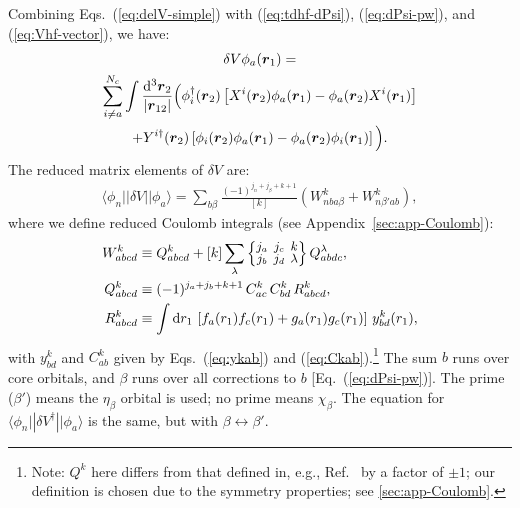 \documentclass[10pt,twocolumn,a4paper]{article}%
\newcommand{\bra}[1]{\ensuremath{\langle #1|}}	%
\newcommand{\ket}[1]{\ensuremath{|#1\rangle}}	%
\newcommand{\sixj}[6]{\renewcommand\arraystretch{0.75}\setlength\arraycolsep{2pt}\small\ensuremath{\begin{Bmatrix}#1&#2&#3\\#4&#5&#6\end{Bmatrix}}}	%
\renewcommand{\v}[1]{\ensuremath{\boldsymbol{#1}}}		%
\newcommand{\be}{\begin{equation}}
\newcommand{\ee}{\end{equation}}
\def\d{\ensuremath{{\rm d}}}
\renewcommand{\b}{\ensuremath{\beta}}
\begin{document}
Combining Eqs.~(\ref{eq:delV-simple}) with (\ref{eq:tdhf-dPsi}), (\ref{eq:dPsi-pw}), and (\ref{eq:Vhf-vector}), we have:
\begin{multline}\label{eq:del-Vhf-vector}
\delta V\phi_a(\v{r}_1) = \\
\sum_{i\neq a}^{N_c}\int \frac{\d^3\v{r}_2}{|\v{r}_{12}|}
\Big(
\phi_i^\dag(\v{r}_2)\left[
X^i(\v{r}_2)\phi_a(\v{r}_1)
-\phi_a(\v{r}_2)  X^i(\v{r}_1)\right]\\
%
+Y^{i\dag}(\v{r}_2)\left[
\phi_i(\v{r}_2)  \phi_a(\v{r}_1)
-\phi_a(\v{r}_2) \phi_i(\v{r}_1)\right]
\Big).
\end{multline}
%
The reduced matrix elements of $\delta V$ are:
\begin{multline}\label{eq:dV-rme}
\bra{\phi_n}|\delta V|\ket{\phi_a}
 =
 \sum_{b\beta}\frac{(-1)^{j_n+j_\beta+k+1}}{[k]}
\left(
W^k_{nba\b} + W^k_{n\b'ab}\right),
\end{multline}
where we define reduced Coulomb integrals (see Appendix~\ref{sec:app-Coulomb}):
\begin{align}
\label{eq:Wk}
W^k_{abcd} & %
\equiv Q^k_{abcd} + [k] \sum_\lambda \sixj{j_a}{j_c}{k}{j_b}{j_d}{\lambda}Q^\lambda_{abdc} ,\\
\label{eq:Qk}
Q^k_{abcd} &\equiv (-1)^{j_a+j_b+k+1} \, C^k_{ac} \, C^k_{bd} \, R^k_{abcd},\\
\label{eq:Rk}
R^k_{abcd} &\equiv \int\d r_1 \, \left[f_a(r_1)f_c(r_1) + g_a(r_1)g_c(r_1)\right]\, y^k_{bd}(r_1),
\end{align}
with $y^k_{bd}$ and $C^k_{ab}$ given by Eqs.~(\ref{eq:ykab}) and (\ref{eq:Ckab}).\footnote{Note: $Q^k$ here differs from that defined in, e.g., Ref.~\cite{DzubaHFS1984} by a factor of $\pm1$; our definition is chosen due to the symmetry properties; see \ref{sec:app-Coulomb}.}
The sum $b$ runs over core orbitals, and $\beta$ runs over all corrections to $b$ [Eq.~(\ref{eq:dPsi-pw})].
The prime ($\beta'$) means the $\eta_\beta$ orbital is used; no prime means $\chi_\beta$.
The equation for $\bra{\phi_n}|\delta V^\dag|\ket{\phi_a}$ is the same, but with $\beta\leftrightarrow\beta'$.


\end{document}
